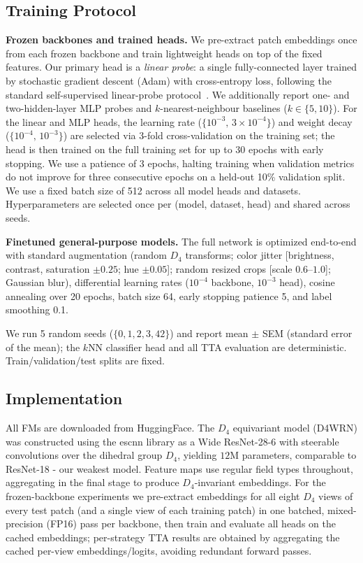 \documentclass{melba}
\begin{document}
\subsection{Training Protocol}

\textbf{Frozen backbones and trained heads.} We pre-extract patch embeddings once from each frozen backbone and train lightweight heads on top of the fixed features. Our primary head is a \emph{linear probe}: a single fully-connected layer trained by stochastic gradient descent (Adam) with cross-entropy loss, following the standard self-supervised linear-probe protocol~\citep{oquab2023dinov2}. We additionally report one- and two-hidden-layer MLP probes and $k$-nearest-neighbour baselines ($k\in\{5,10\}$). For the linear and MLP heads, the learning rate ($\{10^{-3},\,3\times10^{-4}\}$) and weight decay ($\{10^{-4},\,10^{-3}\}$) are selected via 3-fold cross-validation on the training set; the head is then trained on the full training set for up to 30 epochs with early stopping. We use a patience of 3 epochs, halting training when validation metrics do not improve for three consecutive epochs on a held-out 10\% validation split. We use a fixed batch size of 512 across all model heads and datasets. Hyperparameters are selected once per (model, dataset, head) and shared across seeds.

\textbf{Finetuned general-purpose models.} The full network is optimized end-to-end with standard augmentation (random $D_4$ transforms; color jitter [brightness, contrast, saturation $\pm 0.25$; hue $\pm 0.05$]; random resized crops [scale $0.6$--$1.0$]; Gaussian blur), differential learning rates ($10^{-4}$ backbone, $10^{-3}$ head), cosine annealing over 20 epochs, batch size 64, early stopping patience 5, and label smoothing 0.1.

We run 5 random seeds ($\{0,1,2,3,42\}$) and report mean $\pm$ SEM (standard error of the mean); the $k$NN classifier head and all TTA evaluation are deterministic. Train/validation/test splits are fixed.


\subsection{Implementation}

All FMs are downloaded from HuggingFace. The $D_4$ equivariant model (D4WRN) was constructed using the escnn library \citep{weiler2019general} as a Wide ResNet-28-6 with steerable convolutions over the dihedral group $D_4$, yielding $12$M parameters, comparable to ResNet-18 - our weakest model. Feature maps use regular field types throughout, aggregating in the final stage to produce $D_4$-invariant embeddings. For the frozen-backbone experiments we pre-extract embeddings for all eight $D_4$ views of every test patch (and a single view of each training patch) in one batched, mixed-precision (FP16) pass per backbone, then train and evaluate all heads on the cached embeddings; per-strategy TTA results are obtained by aggregating the cached per-view embeddings/logits, avoiding redundant forward passes.
\end{document}
